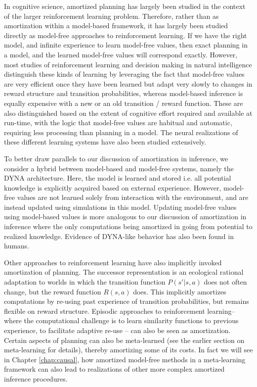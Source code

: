 In cognitive science, amortized planning has largely been studied in the context of the larger reinforcement learning problem. Therefore, rather than as amortization within a model-based framework, it has largely been studied directly as model-free approaches to reinforcement learning. If we have the right model, and infinite experience to learn model-free values, then exact planning in a model, and the learned model-free values will correspond exactly. However, most studies of reinforcement learning and decision making in natural intelligence distinguish these kinds of learning by leveraging the fact that model-free values are very efficient once they have been learned but adapt very slowly to changes in reward structure and transition probabilities, whereas model-based inference is equally expensive with a new or an old transition / reward function\citep{daw2011model}. These are also distinguished based on the extent of cognitive effort required and available at run-time, with the logic that model-free values are habitual and automatic, requiring less processing than planning in a model\citep{otto2014cognitive, kool2017cost}. The neural realizations of these different learning systems have also been studied extensively\citep{glascher2010states, o2003temporal}. 

To better draw parallels to our discussion of amortization in inference, we consider a hybrid between model-based and model-free systems, namely the DYNA architecture\citep{sutton1991dyna}. Here, the model is learned and stored i.e. all potential knowledge is explicitly acquired based on external experience. However, model-free values are not learned solely from interaction with the environment, and are instead updated using simulations in this model. Updating model-free values using model-based values is more analogous to our discussion of amortization in inference where the only computations being amortized in going from potential to realized knowledge. Evidence of DYNA-like behavior has also been found in humans\citep{gershman2014retrospective}.

Other approaches to reinforcement learning have also implicitly invoked amortization of planning. The successor representation\citep{dayan1993improving} is an ecological rational adaptation to worlds in which the transition function $P(s' | s, a)$ does not often change, but the reward function $R(s, a)$ does. This implicitly amortizes computations by re-using past experience of transition probabilities, but remains flexible on reward structure. Episodic approaches to reinforcement learning-- where the computational challenge is to learn similarity functions to previous experience, to facilitate adaptive re-use\citep{gershman2017reinforcement} -- can also be seen as amortization. Certain aspects of planning can also be meta-learned (see the earlier section on meta-learning for details), thereby amortizing some of its costs\citep{botvinick2019reinforcement}. In fact we will see in Chapter \ref{chap:causal}, how amortized model-free methods in a meta-learning framework can also lead to realizations of other more complex amortized inference procedures.

